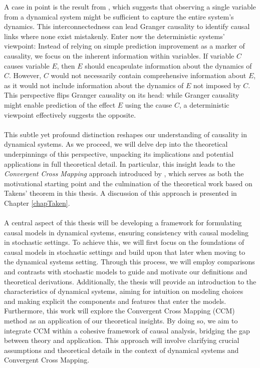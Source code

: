 \documentclass[11pt, a4paper]{memoir}
\theoremstyle{break}
\theoremstyle{break}
\theoremstyle{nonumberplain}
\begin{document}
A case in point is the result from \cite{Takens}, which suggests that observing a single variable from a dynamical system might be sufficient to capture the entire system's dynamics. This interconnectedness can lead Granger causality to identify causal links where none exist mistakenly. Enter now the deterministic systems' viewpoint: Instead of relying on simple prediction improvement as a marker of causality, we focus on the inherent information within variables. If variable 
$C$ causes variable $E$, then $E$ should encapsulate information about the dynamics of $C$. However, $C$ would not necessarily contain comprehensive information about $E$, as it would not include information about the dynamics of $E$ not imposed by $C$. This perspective flips Granger causality on its head: while Granger causality might enable prediction of the effect 
$E$ using the cause $C$, a deterministic viewpoint effectively suggests the opposite. \\\\
This subtle yet profound distinction reshapes our understanding of causality in dynamical systems. As we proceed, we will delve dep into the theoretical underpinnings of this perspective, unpacking its implications and potential applications in full theoretical detail. In particular, this insight leads to the \emph{Convergent Cross Mapping} approach introduced by \cite{Sugihara}, which serves as both the motivational starting point and the culmination of the theoretical work based on Takens' theorem in this thesis. A discussion of this approach is presented in Chapter \ref{chapTaken}.\\\\
A central aspect of this thesis will be developing a framework for formulating causal models in dynamical systems, ensuring consistency with causal modeling in stochastic settings. To achieve this, we will first focus on the foundations of causal models in stochastic settings and build upon that later when moving to the dynamical systems setting. Through this process, we will employ comparisons and contrasts with stochastic models to guide and motivate our definitions and theoretical derivations. Additionally, the thesis will provide an introduction to the characteristics of dynamical systems, aiming for intuition on modeling choices and making explicit the components and features that enter the models. Furthermore, this work will explore the Convergent Cross Mapping (CCM) method as an application of our theoretical insights. By doing so, we aim to integrate CCM within a cohesive framework of causal analysis, bridging the gap between theory and application. This approach will involve clarifying crucial assumptions and theoretical details in the context of dynamical systems and Convergent Cross Mapping.
\newpage
\end{document}
